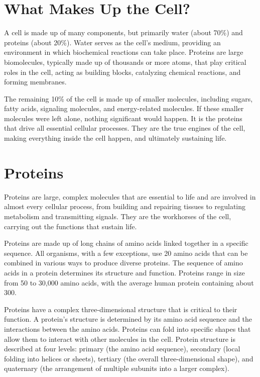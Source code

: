 \section{What Makes Up the Cell?}

A cell is made up of many components, but primarily water (about 70\%) and proteins (about 20\%). Water serves as the cell's medium, providing an environment in which biochemical reactions can take place. Proteins are large biomolecules, typically made up of thousands or more atoms, that play critical roles in the cell, acting as building blocks, catalyzing chemical reactions, and forming membranes.

The remaining 10\% of the cell is made up of smaller molecules, including sugars, fatty acids, signaling molecules, and energy-related molecules. If these smaller molecules were left alone, nothing significant would happen. It is the proteins that drive all essential cellular processes. They are the true engines of the cell, making everything inside the cell happen, and ultimately sustaining life.

\section{Proteins}

Proteins are large, complex molecules that are essential to life and are involved in almost every cellular process, from building and repairing tissues to regulating metabolism and transmitting signals. They are the workhorses of the cell, carrying out the functions that sustain life.

Proteins are made up of long chains of amino acids linked together in a specific sequence. All organisms, with a few exceptions, use 20 amino acids that can be combined in various ways to produce diverse proteins. The sequence of amino acids in a protein determines its structure and function. Proteins range in size from 50 to 30,000 amino acids, with the average human protein containing about 300.

Proteins have a complex three-dimensional structure that is critical to their function. A protein's structure is determined by its amino acid sequence and the interactions between the amino acids. Proteins can fold into specific shapes that allow them to interact with other molecules in the cell. Protein structure is described at four levels: primary (the amino acid sequence), secondary (local folding into helices or sheets), tertiary (the overall three-dimensional shape), and quaternary (the arrangement of multiple subunits into a larger complex).


